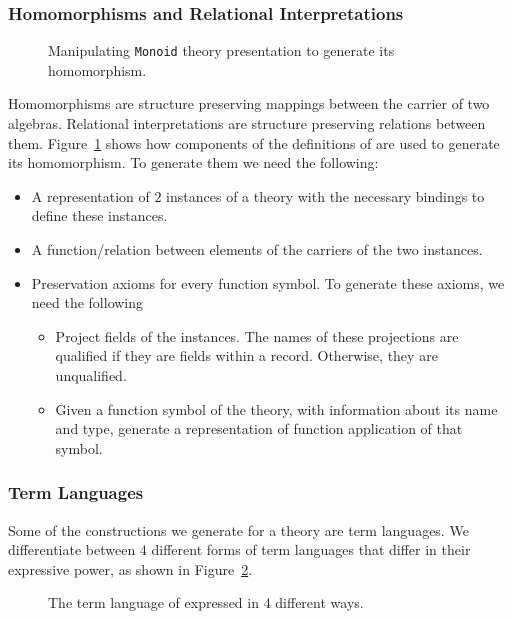 \subsubsection{Homomorphisms and Relational Interpretations}
\begin{figure}

\caption{Manipulating \lstinline|Monoid| theory presentation to generate its homomorphism.}
\label{fig:monoid-hom-rel}
\end{figure}

Homomorphisms are structure preserving mappings between the carrier of two algebras. Relational interpretations are structure preserving relations between them. Figure~\ref{fig:monoid-hom-rel} shows how components of the definitions of  are used to generate its homomorphism. To generate them we need the following: 
\begin{itemize}
\item A representation of $2$ instances of a theory with the necessary bindings to define these instances.  
\item A function/relation between elements of the carriers of the two instances. 
\item Preservation axioms for every function symbol. To generate these axioms, we need the following 
    \begin{itemize}
    \item Project fields of the instances. The names of these projections are qualified if they are fields within a record. Otherwise, they are unqualified.   
    \item Given a function symbol of the theory, with information about its name and type, generate a representation of function application of that symbol.  
    \end{itemize}
\end{itemize}

\subsubsection{Term Languages}
Some of the constructions we generate for a theory are term languages. 
We differentiate between $4$ different forms of term languages that differ in their expressive power, as shown in Figure~\ref{fig:term-lang-4-forms}. 
\begin{figure}
    
    \caption{The term language of  expressed in $4$ different ways.}
    \label{fig:term-lang-4-forms}
\end{figure}

